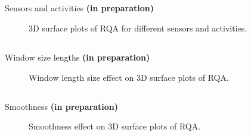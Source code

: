 \subsection{}
{

\begin{frame}{Sensors and activities
	{\bf (in preparation)}
}
    \begin{figure}
	\caption{3D surface plots of RQA for 
	different sensors and activities.} 
   \end{figure}
	
\end{frame}
}






\subsection{}
{

\begin{frame}{Window size lengths
	{\bf (in preparation)}
}
   \begin{figure}
	\caption{Window length size effect on 3D surface plots of RQA.} 
   \end{figure}
	
\end{frame}
}





\subsection{}
{

\begin{frame}{Smoothness
	{\bf (in preparation)}
}
    \begin{figure}
	\caption{Smoothness effect on 3D surface plots of RQA.} 
   \end{figure}
	
\end{frame}
}




